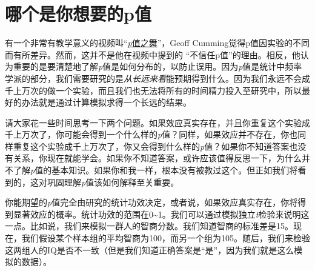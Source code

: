 \documentclass[
  letterpaper,
  DIV=11,
  numbers=noendperiod]{scrreprt}
\begin{document}
\hypertarget{sec-whichpexpect}{%
\section{哪个是你想要的p值}\label{sec-whichpexpect}}

有一个非常有教学意义的视频叫``\href{https://www.youtube.com/watch?v=5OL1RqHrZQ8}{\emph{p}值之舞}''，Geoff
Cumming觉得p值因实验的不同而有所差异。然而，这并不是他在视频中提到的
``不信任p值''的理由。相反，他认为重要的是要清楚地了解\emph{p}值是如何分布的，以防止误用。因为\emph{p}值是统计中频率学派的部分，我们需要研究的是\emph{从长远来看}能预期得到什么。因为我们永远不会成千上万次的做一个实验，而且我们也无法将所有的时间精力投入至研究中，所以最好的办法就是通过计算模拟求得一个长远的结果。

请大家花一些时间思考一下两个问题。如果效应真实存在，并且你重复这个实验成千上万次了，你可能会得到一个什么样的\emph{p}值？同样，如果效应并不存在，你也同样重复这个实验成千上万次了，你又会得到什么样的\emph{p}值？如果你不知道答案也没有关系，你现在就能学会。如果你不知道答案，或许应该值得反思一下，为什么并不了解\emph{p}值的基本知识。如果你和我一样，根本没有被教过这个。但正如我们将看到的，这对巩固理解\emph{p}值该如何解释至关重要。

你能期望的\emph{p}值完全由研究的统计功效决定，或者说，如果效应真实存在，你将得到显著效应的概率。统计功效的范围在0\textasciitilde1。我们可以通过模拟独立\emph{t}检验来说明这一点。比如说，我们来模拟一群人的智商分数。我们知道智商的标准差是15。现在，我们假设某个样本组的平均智商为100，而另一个组为105。随后，我们来检验这两组人的IQ是否不一致（但是我们知道正确答案是``是''，因为我们就是这么模拟的数据）。
\end{document}
